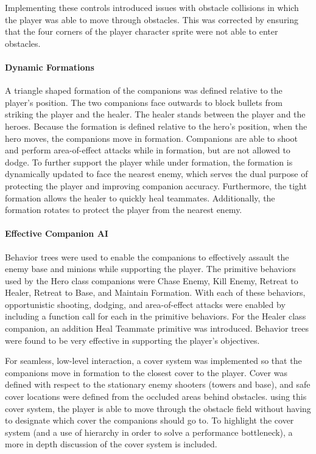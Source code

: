 \documentclass[11pt]{article}
\begin{document}
Implementing these controls introduced issues with obstacle collisions in which the player was able to move through obstacles. This was corrected by ensuring that the four corners of the player character sprite were not able to enter obstacles.

\paragraph{Dynamic Formations}
A triangle shaped formation of the companions was defined relative to the player's position. The two companions face outwards to block bullets from striking the player and the healer. The healer stands between the player and the heroes. Because the formation is defined relative to the hero's position, when the hero moves, the companions move in formation. Companions are able to shoot and perform area-of-effect attacks while in formation, but are not allowed to dodge. To further support the player while under formation, the formation is dynamically updated to face the nearest enemy, which serves the dual purpose of protecting the player and improving companion accuracy. Furthermore, the tight formation allows the healer to quickly heal teammates.  Additionally, the formation rotates to protect the player from the nearest enemy. 

\paragraph{Effective Companion AI}
Behavior trees were used to enable the companions to effectively assault the enemy base and minions while supporting the player. The primitive behaviors used by the Hero class companions were Chase Enemy, Kill Enemy, Retreat to Healer, Retreat to Base, and Maintain Formation. With each of these behaviors, opportunistic shooting, dodging, and area-of-effect attacks were enabled by including a function call for each in the primitive behaviors. For the Healer class companion, an addition Heal Teammate primitive was introduced. Behavior trees were found to be very effective in supporting the player's objectives.

For seamless, low-level interaction, a cover system was implemented so that the companions move in formation to the closest cover to the player. Cover was defined with respect to the stationary enemy shooters (towers and base), and safe cover locations were defined from the occluded areas behind obstacles. using this cover system, the player is able to move through the obstacle field without having to designate which cover the companions should go to.  To highlight the cover system (and a use of hierarchy in order to solve a performance bottleneck), a more in depth discussion of the cover system is included. 
\end{document}
